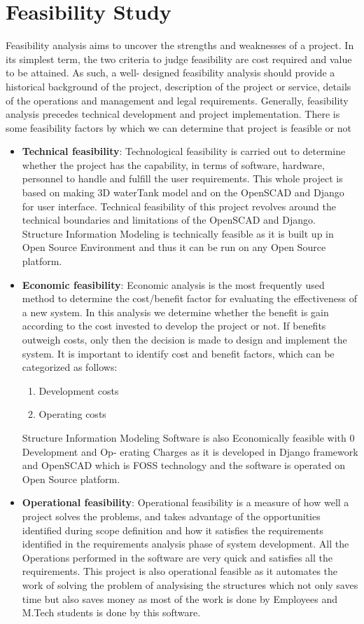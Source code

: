 \documentclass[12pt,includeheadfoot,a4paper]{report}
\begin{document}
\section{Feasibility Study}
Feasibility analysis aims to uncover the strengths and weaknesses of a project. In its simplest term,
the two criteria to judge feasibility are cost required and value to be attained. As such, a well-
designed feasibility analysis should provide a historical background of the project, description of the
project or service, details of the operations and management and legal requirements. Generally,
feasibility analysis precedes technical development and project implementation. There is some
feasibility factors by which we can determine that project is feasible or not
\begin{itemize}
	\item {\bf{Technical feasibility}}: Technological feasibility is carried out to determine whether the
project has the capability, in terms of software, hardware, personnel to handle and fulfill
the user requirements. This whole project is based on making 3D waterTank model and on
the OpenSCAD and Django for user interface. Technical feasibility of this project revolves
around the technical boundaries and limitations of the OpenSCAD and Django. Structure
Information Modeling is technically feasible as it is built up in Open Source Environment
and thus it can be run on any Open Source platform.
	
	\item {\bf{Economic feasibility}}: Economic analysis is the most frequently used method to determine
the cost/benefit factor for evaluating the effectiveness of a new system. In this analysis we
determine whether the benefit is gain according to the cost invested to develop the project
or not. If benefits outweigh costs, only then the decision is made to design and implement
the system. It is important to identify cost and benefit factors, which can be categorized as
follows:
\begin{enumerate} 
\item Development costs
\item Operating costs
\end{enumerate}
Structure Information Modeling Software is also Economically feasible with 0 Development
and Op- erating Charges as it is developed in Django framework and OpenSCAD which is
FOSS technology and the software is operated on Open Source platform.

        \item {\bf{Operational feasibility}}: Operational feasibility is a measure of how well a project solves
the problems, and takes advantage of the opportunities identified during scope definition
and how it satisfies the requirements identified in the requirements analysis phase of system
development. All the Operations performed in the software are very quick and satisfies all
the requirements. This project is also operational feasible as it automates the work of solving
the problem of analysising the structures which not only saves time but also saves money as
most of the work is done by Employees and M.Tech students is done by this software.

\end{itemize}
\end{document}
